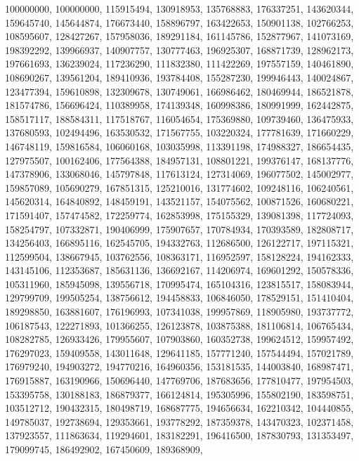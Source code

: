 {  {
    100000000, 100000000, 115915494, 130918953, 135768883, 176337251,
    143620344, 159645740, 145644874, 176673440, 158896797, 163422653,
    150901138, 102766253, 108595607, 128427267, 157958036, 189291184,
    161145786, 152877967, 141073169, 198392292, 139966937, 140907757,
    130777463, 196925307, 168871739, 128962173, 197661693, 136239024,
    117236290, 111832380, 111422269, 197557159, 140461890, 108690267,
    139561204, 189410936, 193784408, 155287230, 199946443, 140024867,
    123477394, 159610898, 132309678, 130749061, 166986462, 180469944,
    186521878, 181574786, 156696424, 110389958, 174139348, 160998386,
    180991999, 162442875, 158517117, 188584311, 117518767, 116054654,
    175369880, 109739460, 136475933, 137680593, 102494496, 163530532,
    171567755, 103220324, 177781639, 171660229, 146748119, 159816584,
    106060168, 103035998, 113391198, 174988327, 186654435, 127975507,
    100162406, 177564388, 184957131, 108801221, 199376147, 168137776,
    147378906, 133068046, 145797848, 117613124, 127314069, 196077502,
    145002977, 159857089, 105690279, 167851315, 125210016, 131774602,
    109248116, 106240561, 145620314, 164840892, 148459191, 143521157,
    154075562, 100871526, 160680221, 171591407, 157474582, 172259774,
    162853998, 175155329, 139081398, 117724093, 158254797, 107332871,
    190406999, 175907657, 170784934, 170393589, 182808717, 134256403,
    166895116, 162545705, 194332763, 112686500, 126122717, 197115321,
    112599504, 138667945, 103762556, 108363171, 116952597, 158128224,
    194162333, 143145106, 112353687, 185631136, 136692167, 114206974,
    169601292, 150578336, 105311960, 185945098, 139556718, 170995474,
    165104316, 123815517, 158083944, 129799709, 199505254, 138756612,
    194458833, 106846050, 178529151, 151410404, 189298850, 163881607,
    176196993, 107341038, 199957869, 118905980, 193737772, 106187543,
    122271893, 101366255, 126123878, 103875388, 181106814, 106765434,
    108282785, 126933426, 179955607, 107903860, 160352738, 199624512,
    159957492, 176297023, 159409558, 143011648, 129641185, 157771240,
    157544494, 157021789, 176979240, 194903272, 194770216, 164960356,
    153181535, 144003840, 168987471, 176915887, 163190966, 150696440,
    147769706, 187683656, 177810477, 197954503, 153395758, 130188183,
    186879377, 166124814, 195305996, 155802190, 183598751, 103512712,
    190432315, 180498719, 168687775, 194656634, 162210342, 104440855,
    149785037, 192738694, 129353661, 193778292, 187359378, 143470323,
    102371458, 137923557, 111863634, 119294601, 183182291, 196416500,
    187830793, 131353497, 179099745, 186492902, 167450609, 189368909,
}}
